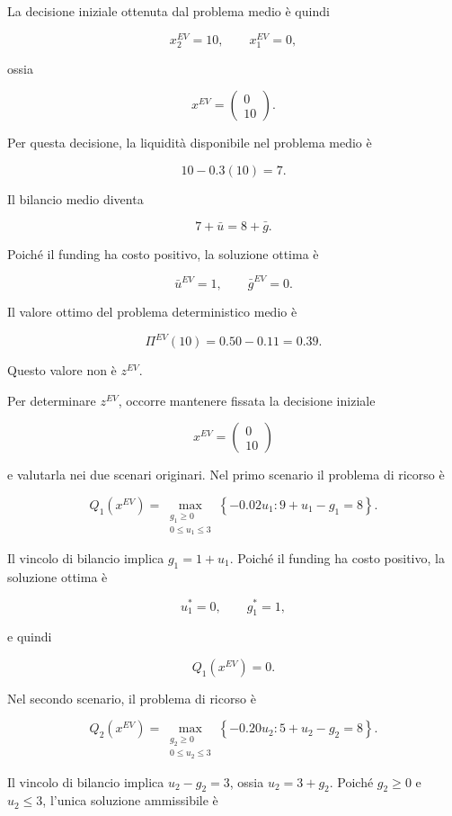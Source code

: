 \begin{enumerate}
La decisione iniziale ottenuta
dal problema medio \`e quindi

\[
x_2^{EV}=10,
\qquad
x_1^{EV}=0,
\]

ossia

\[
\boxed{
x^{EV}
=
\begin{pmatrix}
0\\
10
\end{pmatrix}.
}
\]

Per questa decisione,
la liquidit\`a disponibile nel problema medio \`e

\[
10-0.3(10)=7.
\]

Il bilancio medio diventa

\[
7+\bar u=8+\bar g.
\]

Poich\'e il funding ha costo positivo,
la soluzione ottima \`e

\[
\bar u^{EV}=1,
\qquad
\bar g^{EV}=0.
\]

Il valore ottimo del problema deterministico medio \`e

\[
\Pi^{EV}(10)
=
0.50-0.11
=
0.39.
\]

Questo valore non \`e $z^{EV}$.

Per determinare $z^{EV}$, occorre
mantenere fissata la decisione iniziale

\[
x^{EV}
=
\begin{pmatrix}
0\\
10
\end{pmatrix}
\]

e valutarla nei due scenari originari.
Nel primo scenario il problema di ricorso \`e

\[
Q_1(x^{EV})
=
\max_{\substack{g_1\geq0\\0\leq u_1\leq3}}
\left\{
-0.02u_1:
9+u_1-g_1=8
\right\}.
\]

Il vincolo di bilancio implica $g_1=1+u_1$.
Poich\'e il funding ha costo positivo,
la soluzione ottima \`e

\[
u_1^*=0,
\qquad
g_1^*=1,
\]

e quindi

\[
Q_1(x^{EV})=0.
\]

Nel secondo scenario, il problema di ricorso \`e

\[
Q_2(x^{EV})
=
\max_{\substack{g_2\geq0\\0\leq u_2\leq3}}
\left\{
-0.20u_2:
5+u_2-g_2=8
\right\}.
\]

Il vincolo di bilancio implica $u_2-g_2=3$, ossia $u_2=3+g_2$.
Poich\'e $g_2\geq0$
e $u_2\leq3$, l'unica soluzione ammissibile \`e


\end{enumerate}
